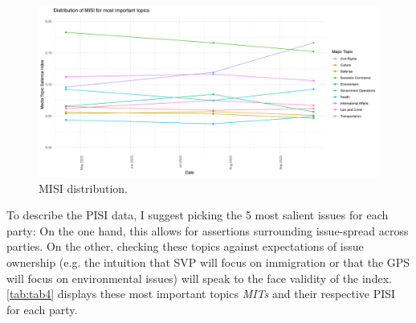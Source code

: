 \documentclass[11pt,a4paper]{article}
\begin{document}
\begin{figure}
    \centering
    \includegraphics[width=1\linewidth]{output/plots/plot_figure_5.png}
    \caption{MISI distribution.}
    \label{fig:fig5}
\end{figure}

To describe the PISI data, I suggest picking the 5 most salient issues for each party: On the one hand, this allows for assertions surrounding issue-spread across parties. On the other, checking these topics against expectations of issue ownership (e.g. the intuition that SVP will focus on immigration or that the GPS will focus on environmental issues) will speak to the face validity of the index. \autoref{tab:tab4} displays these most important topics \textit{MITs} and their respective PISI for each party.
\end{document}
